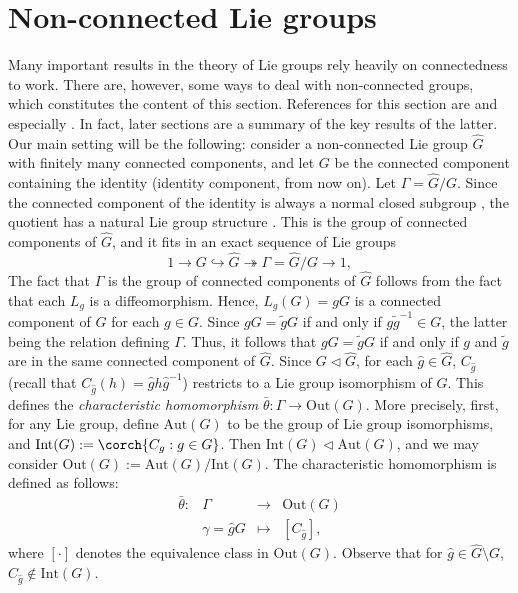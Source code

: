\section{Non-connected Lie groups} \label{appendix_non_connected_lie_groups}
Many important results in the theory of Lie groups rely heavily on connectedness to work. There are, however, some ways to deal with non-connected groups, which constitutes the content of this section. References for this section are \parencite[Ch. 18]{hilgert2011structure} and especially \parencite{barajas2023non}. In fact, later sections are a summary of the key results of the latter. Our main setting will be the following: consider a non-connected Lie group \(\hat{G}\) with finitely many connected components, and let \(G\) be the connected component containing the identity (identity component, from now on). Let \(\Gamma=\hat{G}/G\). Since the connected component of the identity is always a normal closed subgroup \parencite[Prop. 7.15]{lee_introSM}, the quotient has a natural Lie group structure \parencite[Th. 21.26]{lee_introSM}. This is the group of connected components of \(\hat{G}\), and it fits in an exact sequence of Lie groups
\begin{equation} \label{eq_sequence_Lie_groups}
1 \to G \hookrightarrow \hat{G} \twoheadrightarrow \Gamma=\hat{G}/G \to 1,
\end{equation}
The fact that \(\Gamma\) is the group of connected components of \(\hat{G}\) follows from the fact that each \(L_g\) is a diffeomorphism. Hence, \(L_g(G)=gG\) is a connected component of \(\hat{G}\) for each \(g\in G\). Since \(gG=\tilde{g}G\) if and only if \(g\tilde{g}^{-1}\in G\), the latter being the relation defining \(\Gamma\). Thus, it follows that \(gG=\tilde{g}G\) if and only if \(g\) and \(\tilde{g}\) are in the same connected component of \(\hat{G}\). Since \(G \triangleleft \hat{G}\), for each \(\hat{g} \in \hat{G}\), \(C_{\hat{g}}\) (recall that \(C_{\hat{g}}(h)=\hat{g}h\hat{g}^{-1}\)) restricts to a Lie group isomorphism of \(G\). This defines the \textit{characteristic homomorphism} \(\bar{\theta}\colon \Gamma \to \mathrm{Out}(G)\). More precisely, first, for any Lie group, define \(\mathrm{Aut}(G)\) to be the group of Lie group isomorphisms, and \(\mathrm{Int}(G):=\corch{C_g:g \in G}\). Then \(\mathrm{Int}(G) \triangleleft \mathrm{Aut}(G)\), and we may consider \(\mathrm{Out}(G):=\mathrm{Aut}(G)/\mathrm{Int}(G)\). The characteristic homomorphism is defined as follows: 
\begin{equation} \label{eq_def_bartheta}
\begin{array}{cccc}
    \bar{\theta}\colon & \Gamma & \longrightarrow & \mathrm{Out}(G) \\
     & \gamma = \hat{g} G & \mapsto & [C_{\hat{g}}],
\end{array}
\end{equation}
where \([\cdot]\) denotes the equivalence class in \(\mathrm{Out}(G)\). Observe that for \(\hat{g}\in \hat{G}\setminus G\), \(C_{\hat{g}}\notin \mathrm{Int}(G)\). 

